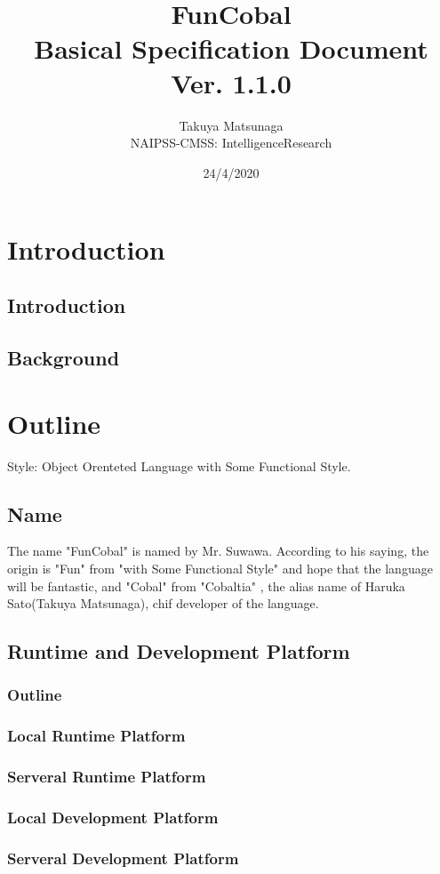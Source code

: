 \documentclass{jarticle}
\title{\\ \\ FunCobal \\ Basical Specification Document \\ Ver. 1.1.0}
\author{Takuya Matsunaga \\ NAIPSS-CMSS: IntelligenceResearch}
\date{24/4/2020}
\begin{document}
\maketitle
\tableofcontents
\newpage
\section{Introduction}
\subsection{Introduction}
\subsection{Background}
\section{Outline}
\par
 Style: Object Orenteted Language with Some Functional Style.
\subsection{Name}
The name "FunCobal" is named by Mr. Suwawa. According to his saying, the origin is "Fun" from "with Some Functional Style" and hope that the language will be fantastic, and "Cobal" from "Cobaltia" , the alias name of Haruka Sato(Takuya Matsunaga), chif developer of the language.
\subsection{Runtime and Development Platform}
\subsubsection{Outline}
\subsubsection{Local Runtime Platform}
\subsubsection{Serveral Runtime Platform}
\subsubsection{Local Development Platform}
\subsubsection{Serveral Development Platform}
\end{document}
